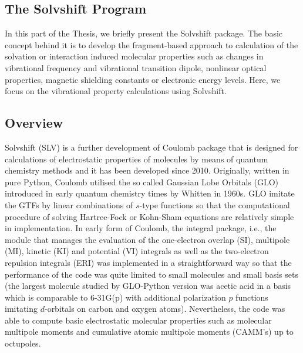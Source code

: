 \documentclass[a4paper,titlepage,twoside,fleqn,12pt]{book}
\begin{document}
\begin{refsection}
\printbibliography[heading=subbibintoc,title={References}]
\end{refsection}




\begin{refsection}
\chapter{The Solvshift Program\label{c:slv}}

In this part of the Thesis, we briefly present the {\sc Solvshift}
package. The basic concept behind it is to develop the fragment\hyp{}based
approach to calculation of the solvation or interaction induced
molecular properties such as changes in vibrational frequency and vibrational 
transition dipole, nonlinear optical properties, magnetic shielding
constants or electronic energy levels. Here, we focus on the
vibrational property calculations using {\sc Solvshift}.

\section{Overview}

{\sc Solvshift} (SLV) is a further development of {\sc Coulomb} package
that is designed for calculations of electrostatic properties of molecules
by means of quantum chemistry methods and it has been developed
since 2010. Originally, written in pure Python, {\sc Coulomb} utilised
the so called Gaussian Lobe Orbitals (GLO) introduced in early quantum chemistry
times by Whitten in 1960s. \citep{Whitten.JCP.1966,Whitten.JCP.1969} 
GLO imitate the GTFs by linear combinations
of $s$-type functions so that the computational procedure of solving
Hartree\hyp{}Fock or Kohn\hyp{}Sham equations are relatively simple
in implementation. In early form of {\sc Coulomb}, the integral package, i.e.,
the module that manages the evaluation of the one\hyp{}electron overlap (SI), multipole (MI),
kinetic (KI) and
potential (VI) integrals as well as the two\hyp{}electron
repulsion integrals (ERI) was implemented in a straightforward way
so that the performance of the code was quite limited to small molecules
and small basis sets (the largest molecule studied by GLO\hyp{}Python version
was acetic acid in a basis which is comparable to 6-31G(p) with additional polarization
$p$ functions imitating $d$-orbitals on carbon and oxygen atoms). Nevertheless,
the code was able to compute basic electrostatic molecular properties such as
molecular multipole moments and cumulative atomic multipole moments 
(CAMM's) \citep{Sokalski.Poirier.CPL.1983} up to octupoles.
 

\end{refsection}
\end{document}
